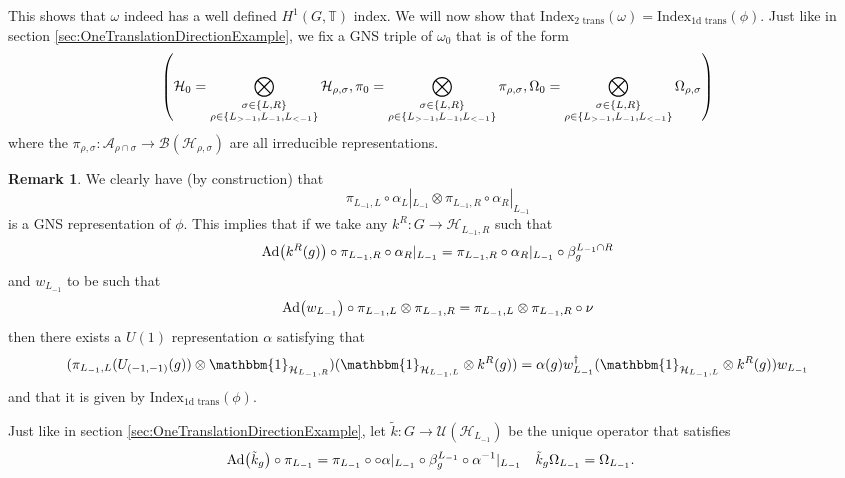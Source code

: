 \documentclass[12pt,a4paper,twoside]{article}
\let\originalleft\left
\let\originalright\right
\renewcommand{\left}{\mathopen{}\mathclose\bgroup\originalleft}
\renewcommand{\right}{\aftergroup\egroup\originalright}
\newcommand{\UU}{\mathcal U}
\newcommand{\BB}{\mathcal B}
\newcommand{\HH}{\mathcal H}
\newcommand{\TT}{\mathbb T}
\renewcommand{\AA}{\mathcal A}
\newcommand{\id}{\mathbbm{1}}
\newcommand{\Ad}[1]{\textrm{Ad}\left(#1\right)}
\theoremstyle{definition}
\newtheorem{remark}[theorem]{Remark}
\numberwithin{equation}{section}
\begin{document}
This shows that $\omega$ indeed has a well defined $H^1(G,\TT)$ index. We will now show that $\textrm{Index}_{\text{2 trans}}(\omega)=\textrm{Index}_{\text{1d trans}}(\phi)$. Just like in section \ref{sec:OneTranslationDirectionExample}, we fix a GNS triple of $\omega_0$ that is of the form
\begin{equation}
	\left(\HH_0=\bigotimes_{\substack{\sigma\in\{L,R\}\\ \rho\in\{L_{>-1},L_{-1},L_{<-1}\}}}\HH_{\rho,\sigma},\pi_0=\bigotimes_{\substack{\sigma\in\{L,R\}\\ \rho\in\{L_{>-1},L_{-1},L_{<-1}\}}}\pi_{\rho,\sigma},\Omega_0=\bigotimes_{\substack{\sigma\in\{L,R\}\\ \rho\in\{L_{>-1},L_{-1},L_{<-1}\}}}\Omega_{\rho,\sigma}\right)
\end{equation}
where the $\pi_{\rho,\sigma}:\AA_{\rho\cap\sigma}\rightarrow\BB(\HH_{\rho,\sigma})$ are all irreducible representations.
\begin{remark}\label{rem:GNS_One_DimensionalTwoTranslations}
	We clearly have (by construction) that
	\begin{equation}
		\pi_{L_{-1},L}\circ\alpha_L|_{L_{-1}}\otimes \pi_{L_{-1},R}\circ\alpha_R|_{L_{-1}}
	\end{equation}
	is a GNS representation of $\phi$. This implies that if we take any $k^R:G\rightarrow \HH_{L_{-1},R}$ such that
	\begin{equation}
		\Ad{k^R(g)}\circ\pi_{L_{-1},R}\circ\alpha_R|_{L_{-1}}=\pi_{L_{-1},R}\circ\alpha_R|_{L_{-1}}\circ\beta_{g}^{L_{-1}\cap R}
	\end{equation}
	and $w_{L_{-1}}$ to be such that
	\begin{equation}
		\Ad{w_{L_{-1}}}\circ\pi_{L_{-1},L}\otimes \pi_{L_{-1},R}=\pi_{L_{-1},L}\otimes \pi_{L_{-1},R}\circ\nu
	\end{equation}
	then there exists a $U(1)$ representation $\alpha$ satisfying that
	\begin{equation}
		(\pi_{L_{-1},L}(U_{(-1,-1)}(g))\otimes \id_{\HH_{L_{-1},R}}) (\id_{\HH_{L_{-1},L}}\otimes k^R(g))=\alpha(g) w_{L_{-1}}^\dagger(\id_{\HH_{L_{-1},L}}\otimes k^R(g))w_{L_{-1}}
	\end{equation}
	and that it is given by $\textrm{Index}_{\text{1d trans}}(\phi)$.
\end{remark}
Just like in section \ref{sec:OneTranslationDirectionExample}, let $\tilde k:G\rightarrow \UU(\HH_{L_{-1}})$ be the unique operator that satisfies
\begin{align}
	\Ad{\tilde{k}_g}\circ\pi_{L_{-1}}&=\pi_{L_{-1}}\circ \circ\alpha|_{L_{-1}}\circ\beta_g^{L_{-1}}\circ \alpha^{-1}|_{L_{-1}}&\tilde k_g\Omega_{L_{-1}}&=\Omega_{L_{-1}}.
\end{align}
\end{document}
